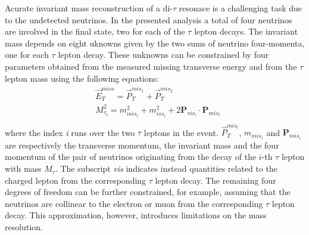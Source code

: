 Acurate invariant mass reconstruction of a di-$\tau$ resonace is a challenging task due to the undetected neutrinos. 
In the presented analysis a total of four neutrinos are involved in the final state, two for each 
of the $\tau$ lepton decays.
The invariant mass depends on eight uknowns given by the two
sums of neutrino four-momenta, one for each $\tau$ lepton decay. These unknowns can be constrained by four parameters 
obtained from the measured  missing transverse energy and from the $\tau$ lepton mass using the following equations:
% 
\begin{equation} \label{eq:MMC}
\begin{split}
&\vec{E}_T^{miss} = \vec{P}_{T}^{mis_{1}} +  \vec{P}_{T}^{mis_2} \\
&M_{\tau_{i}}^2 = m^2_{mis_{i}} + m^2_{vis_{i}} + 2 \mathbf{P}_{vis_i} \cdot \mathbf{P}_{mis_i} \\
\end{split}
\end{equation}
where the index \emph{i} runs over the two $\tau$ leptons in the event. 
$\vec{P}_{T}^{mis_{i}}$, $m_{mis_{i}}$ and $\mathbf{P}_{mis_{i}}$ are respectively the transverse momentum, the invariant mass and 
the four momentum of the pair of neutrinos originating from the decay of the $i$-th  $\tau$ 
lepton with mass $M_{\tau}$. The subscript \emph{vis} indicates instead 
quantities related to the charged lepton from  the corresponding $\tau$ lepton decay. The remaining four degrees of freedom can be 
further constrained, for example, assuming that the neutrinos are collinear to the electron or muon from the corresponding 
$\tau$ lepton decay. This approximation, however, introduces limitations on the mass resolution.

